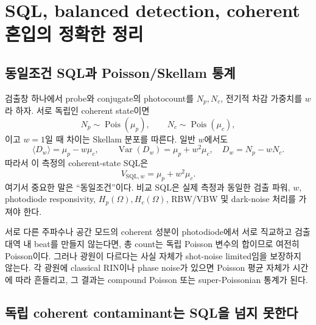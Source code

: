 \documentclass[11pt,a4paper]{article}
\newcommand{\Var}{\operatorname{Var}}
\newcommand{\SQL}{\mathrm{SQL}}
\newcommand{\enquote}[1]{“#1”}
\begin{document}
\section{SQL, balanced detection, coherent 혼입의 정확한 정리}

\subsection{동일조건 SQL과 Poisson/Skellam 통계}

검출창 하나에서 probe와 conjugate의 photocount를 $N_p,N_c$, 전기적 차감 가중치를
$w$라 하자. 서로 독립인 coherent state이면
\begin{equation}
N_p\sim\operatorname{Pois}(\mu_p),\qquad
N_c\sim\operatorname{Pois}(\mu_c),
\end{equation}
이고 $w=1$일 때 차이는 Skellam 분포를 따른다. 일반 $w$에서도
\begin{equation}
\langle D_w\rangle=\mu_p-w\mu_c,\qquad
\Var(D_w)=\mu_p+w^2\mu_c,\quad D_w=N_p-wN_c.
\label{eq:coherent-sql}
\end{equation}
따라서 이 측정의 coherent-state SQL은
\begin{equation}
V_{\SQL,w}=\mu_p+w^2\mu_c.
\label{eq:same-condition-sql}
\end{equation}
여기서 중요한 말은 \enquote{동일조건}이다. 비교 SQL은 실제 측정과 동일한 검출
파워, $w$, photodiode responsivity, $H_p(\Omega),H_c(\Omega)$, RBW/VBW 및
dark-noise 처리를 가져야 한다.

서로 다른 주파수나 공간 모드의 coherent 성분이 photodiode에서 서로 직교하고
검출 대역 내 beat를 만들지 않는다면, 총 count는 독립 Poisson 변수의 합이므로
여전히 Poisson이다. 그러나 광원이 다르다는 사실 자체가 shot-noise limited임을
보장하지 않는다. 각 광원에 classical RIN이나 phase noise가 있으면 Poisson 평균
자체가 시간에 따라 흔들리고, 그 결과는 compound Poisson 또는 super-Poissonian
통계가 된다.

\subsection{독립 coherent contaminant는 SQL을 넘지 못한다}
\end{document}
